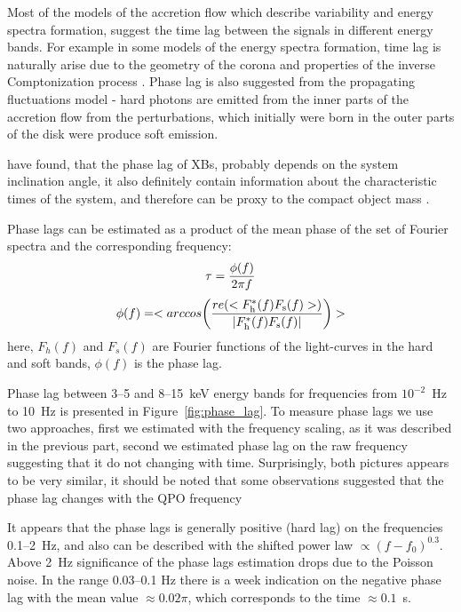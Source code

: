 \documentclass[a4paper,fleqn,usenatbib]{mnras}
\begin{document}
    Most of the models of the accretion flow which describe variability and energy spectra formation, suggest the time lag between the signals in different energy bands. 
For example in some models of the energy spectra formation, time lag is naturally arise due to the geometry of the corona and properties of the inverse Comptonization process \citep[see, e.g.][]{kotov01}.
Phase lag is also suggested from the propagating fluctuations model - hard photons are emitted from the inner parts of the accretion flow from the perturbations, which initially were born in the outer parts of the disk were produce soft emission.  

\citep{eijeden17} have found, that the phase lag of XBs, probably depends on the system inclination angle, it also definitely contain information about the characteristic times of the system, and therefore can be proxy to the compact object mass \citep{}. 

Phase lags can be estimated as a product of the mean phase of the set of Fourier spectra and the corresponding frequency:
\begin{equation}
                \tau = \frac{\phi(f)}{2\pi f}\\
\end{equation}
\begin{equation}
        \phi(f) = <arccos{\left(\frac{re(<F_{\rm h}^{*}(f)F_{\rm s}(f)>)}{|F_{\rm h}^{*}(f) F_{\rm s}(f)|}\right)}>
        \label{eq:phase_lag}
\end{equation}
here, $F_h(f)$ and $F_s(f)$ are Fourier functions of the light-curves in the hard and soft bands, $\phi(f)$ is the phase lag. 

Phase lag between 3--5 and 8--15~keV energy bands for frequencies from $10^{-2}$~Hz to 10~Hz is presented in Figure~\ref{fig:phase_lag}.
To measure phase lags we use two approaches, first we estimated with the frequency scaling, as it was described in the previous part, second we estimated phase lag on the raw frequency suggesting that it do not changing with time.
Surprisingly, both pictures appears to be very similar, it should be noted that some observations suggested that the phase lag changes with the QPO frequency \citep{}

It appears that the phase lags is generally positive (hard lag) on the frequencies 0.1--2~Hz, and also can be described with the shifted power law $\propto(f - f_0)^{0.3}$. 
Above 2~Hz significance of the phase lags estimation drops due to the Poisson noise.
In the range 0.03--0.1 Hz there is a week indication on the negative phase lag with the mean value $\approx 0.02\pi$, which corresponds to the time $\approx0.1$~s.
\end{document}
